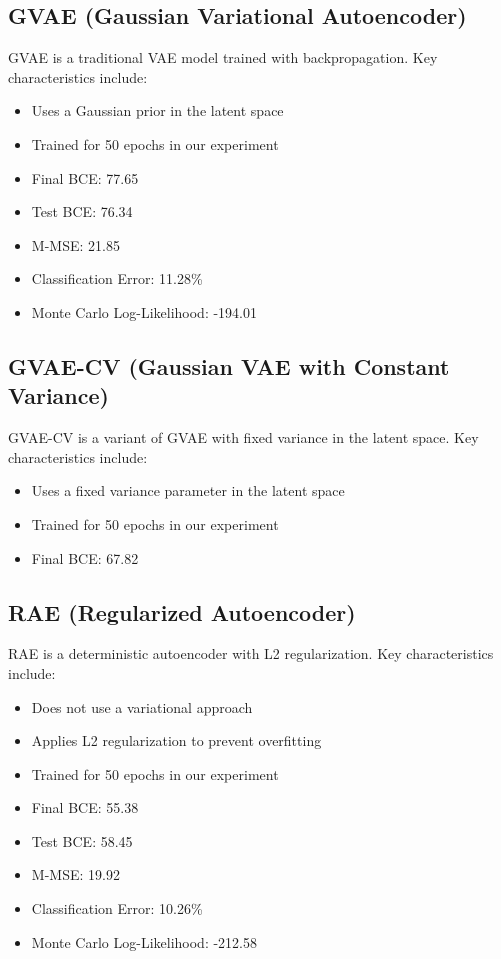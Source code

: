 \documentclass[11pt,a4paper]{article}
\begin{document}
\subsection{GVAE (Gaussian Variational Autoencoder)}
GVAE is a traditional VAE model trained with backpropagation. Key characteristics include:
\begin{itemize}
    \item Uses a Gaussian prior in the latent space
    \item Trained for 50 epochs in our experiment
    \item Final BCE: 77.65
    \item Test BCE: 76.34
    \item M-MSE: 21.85
    \item Classification Error: 11.28\%
    \item Monte Carlo Log-Likelihood: -194.01
\end{itemize}

\subsection{GVAE-CV (Gaussian VAE with Constant Variance)}
GVAE-CV is a variant of GVAE with fixed variance in the latent space. Key characteristics include:
\begin{itemize}
    \item Uses a fixed variance parameter in the latent space
    \item Trained for 50 epochs in our experiment
    \item Final BCE: 67.82
\end{itemize}

\subsection{RAE (Regularized Autoencoder)}
RAE is a deterministic autoencoder with L2 regularization. Key characteristics include:
\begin{itemize}
    \item Does not use a variational approach
    \item Applies L2 regularization to prevent overfitting
    \item Trained for 50 epochs in our experiment
    \item Final BCE: 55.38
    \item Test BCE: 58.45
    \item M-MSE: 19.92
    \item Classification Error: 10.26\%
    \item Monte Carlo Log-Likelihood: -212.58
\end{itemize}
\end{document}
